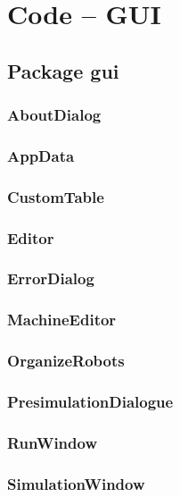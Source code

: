 \documentclass[%
  a4paper,%
  11pt,%
  blue,%
  hyperref	%
  ]{tubsartcl}
\begin{document}
\section{Code -- GUI}


\subsection{Package gui}

\subsubsection{AboutDialog}

\subsubsection{AppData}

\subsubsection{CustomTable}

\subsubsection{Editor}

\subsubsection{ErrorDialog}

\subsubsection{MachineEditor}

\subsubsection{OrganizeRobots}

\subsubsection{PresimulationDialogue}

\subsubsection{RunWindow}

\subsubsection{SimulationWindow}
\end{document}
